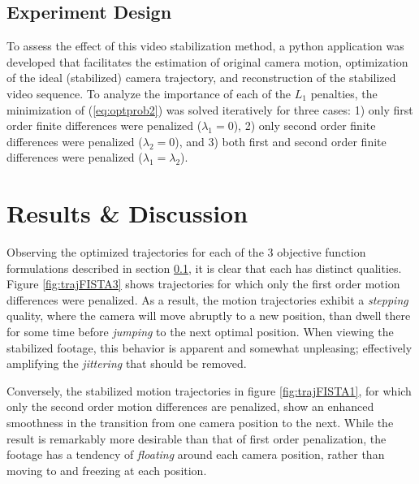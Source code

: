 \documentclass{article} %
\begin{document}
\subsection{Experiment Design} \label{sec:expdesign}
To assess the effect of this video stabilization method, a python application was developed that facilitates the estimation of original camera motion, optimization of the ideal (stabilized) camera trajectory, and reconstruction of the stabilized video sequence. To analyze the importance of each of the $L_1$ penalties, the minimization of (\ref{eq:optprob2}) was solved iteratively for three cases: 1) only first order finite differences were penalized ($\lambda_1=0$), 2) only second order finite differences were penalized ($\lambda_2=0$), and 3) both first and second order finite differences were penalized ($\lambda_1=\lambda_2$).

\section{Results \& Discussion}
Observing the optimized trajectories for each of the 3 objective function formulations described in section \ref{sec:expdesign}, it is clear that each has distinct qualities. Figure \ref{fig:trajFISTA3} shows trajectories for which only the first order motion differences were penalized. As a result, the motion trajectories exhibit a \textit{stepping} quality, where the camera will move abruptly to a new position, than dwell there for some time before \textit{jumping} to the next optimal position. When viewing the stabilized footage, this behavior is apparent and somewhat unpleasing; effectively amplifying the \textit{jittering} that should be removed.

Conversely, the stabilized motion trajectories in figure \ref{fig:trajFISTA1}, for which only the second order motion differences are penalized, show an enhanced smoothness in the transition from one camera position to the next. While the result is remarkably more desirable than that of first order penalization, the footage has a tendency of \textit{floating} around each camera position, rather than moving to and freezing at each position.
\end{document}
